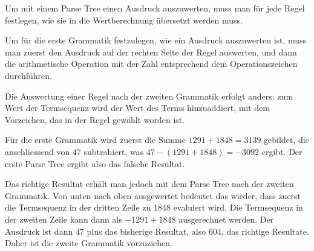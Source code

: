 \begin{loesung}
\begin{teilaufgaben}
\begin{center}
\end{center}

\item
Um mit einem Parse Tree einen Ausdruck auszuwerten, muss man für
jede Regel festlegen, wie sie in die Wertberechnung übersetzt werden
muss.

Um für die erste Grammatik festzulegen, wie ein Ausdruck auszuwerten
ist, muss man zuerst den Ausdruck auf der rechten Seite der 
Regel auswerten, und dann die arithmetische Operation mit der Zahl
entsprechend dem Operationszeichen durchführen.

Die Auswertung einer Regel nach der zweiten Grammatik erfolgt anders:
zum Wert der Termsequenz
wird der Wert des Terms hinzuaddiert, mit dem Vorzeichen, das in der
Regel gewählt worden ist.
\item
Für die erste Grammatik wird zuerst die Summe $1291+1848= 3139$
gebildet, die anschliessend von $47$ subtrahiert, was
$
47-(1291+1848)
=
-3092
$
ergibt.
Der erste Parse Tree ergibt also das falsche Resultat.

Das richtige Resultat erhält man jedoch mit dem Parse
Tree nach der zweiten Grammatik.
Von unten nach oben ausgewertet bedeutet das wieder, dass zuerst 
die Termsequenz in der dritten Zeile zu 1848 evaluiert wird.
Die Termsequenz in der zweiten Zeile kann dann als $-1291 + 1848$
ausgerechnet werden. Der Ausdruck ist dann $47$ plus das bisherige
Resultat, also 
$604$, das richtige Resultate.
Daher ist die zweite Grammatik vorzuziehen.
\qedhere
\end{teilaufgaben}
\end{loesung}
